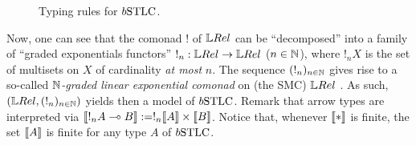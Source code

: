 \begin{figure}
	\caption{Typing rules for $\BSTLC$.}
	\label{fig:rules}
	\end{figure}



Now, one can see that the comonad $!$ of $\LREL$ can be ``decomposed'' into a family of ``graded exponentials functors'' $!_n:\LREL\to\LREL$ ($n\in\mathbb{N}$), where $!_{n}X$ is the set of multisets on $X$ of cardinality \emph{at most} $n$. %
The sequence $(!_n)_{n\in\mathbb{N}}$ gives rise to a so-called \emph{$\mathbb{N}$-graded linear exponential comonad} on (the SMC) $\LREL$ \cite{Katsumata2018}. %
As such, $(\LREL,(!_n)_{n\in\N})$ yields then a model of $\BSTLC$. Remark that arrow types are interpreted via $\llbracket!_{n}A\multimap B\rrbracket:= !_{n}\llbracket A\rrbracket \times \llbracket B\rrbracket$. Notice that, whenever $\llbracket*\rrbracket$ is finite, the set $\llbracket A\rrbracket$ is finite for any type $A$ of $\BSTLC$.


